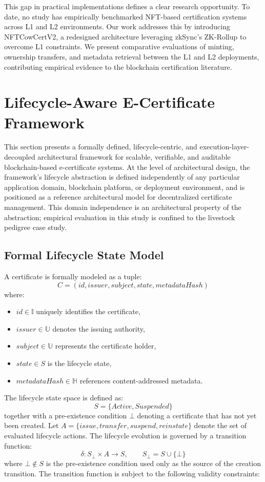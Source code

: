 \documentclass[pdflatex,sn-mathphys-num]{sn-jnl}
\begin{document}
This gap in practical implementations defines a clear research opportunity. To date, no study has empirically benchmarked NFT-based certification systems across L1 and L2 environments. Our work addresses this by introducing NFTCowCertV2, a redesigned architecture leveraging zkSync’s ZK-Rollup to overcome L1 constraints. We present comparative evaluations of minting, ownership transfers, and metadata retrieval between the L1 and L2 deployments, contributing empirical evidence to the blockchain certification literature.

\section{Lifecycle-Aware E-Certificate Framework}

This section presents a formally defined, lifecycle-centric, and execution-layer-decoupled architectural framework for scalable, verifiable, and auditable blockchain-based e-certificate systems. At the level of architectural design, the framework's lifecycle abstraction is defined independently of any particular application domain, blockchain platform, or deployment environment, and is positioned as a reference architectural model for decentralized certificate management. This domain independence is an architectural property of the abstraction; empirical evaluation in this study is confined to the livestock pedigree case study.

\subsection{Formal Lifecycle State Model}

A certificate is formally modeled as a tuple:
\[
C = (id, issuer, subject, state, metadataHash)
\]
where:
\begin{itemize}
    \item $id \in \mathbb{I}$ uniquely identifies the certificate,
    \item $issuer \in \mathbb{U}$ denotes the issuing authority,
    \item $subject \in \mathbb{U}$ represents the certificate holder,
    \item $state \in S$ is the lifecycle state,
    \item $metadataHash \in \mathbb{H}$ references content-addressed metadata.
\end{itemize}

The lifecycle state space is defined as:
\[
S = \{\textit{Active}, \textit{Suspended}\}
\]
together with a pre-existence condition $\bot$ denoting a certificate that has not yet been created. Let $A = \{\textit{issue}, \textit{transfer}, \textit{suspend}, \textit{reinstate}\}$ denote the set of evaluated lifecycle actions. The lifecycle evolution is governed by a transition function:
\[
\delta : S_{\bot} \times A \rightarrow S, \qquad S_{\bot} = S \cup \{\bot\}
\]
where $\bot \notin S$ is the pre-existence condition used only as the source of the creation transition. The transition function is subject to the following validity constraints:
\end{document}

